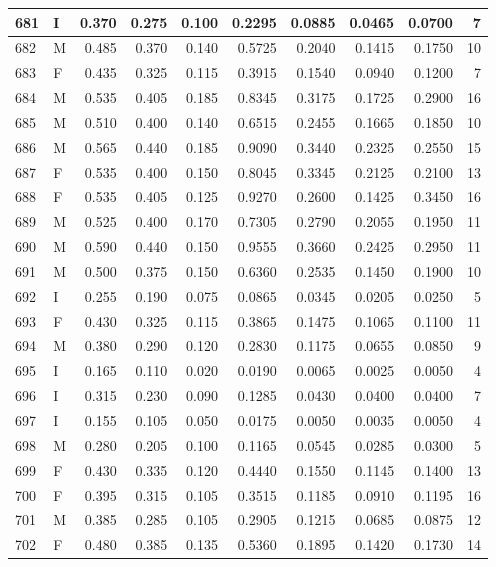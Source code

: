 \documentclass[9pt,twocolumn,twoside,]{pnas-new}
\begin{document}
\begin{tabular}{l|l|r|r|r|r|r|r|r|r}
\hline
681 & I & 0.370 & 0.275 & 0.100 & 0.2295 & 0.0885 & 0.0465 & 0.0700 & 7\\
\hline
682 & M & 0.485 & 0.370 & 0.140 & 0.5725 & 0.2040 & 0.1415 & 0.1750 & 10\\
\hline
683 & F & 0.435 & 0.325 & 0.115 & 0.3915 & 0.1540 & 0.0940 & 0.1200 & 7\\
\hline
684 & M & 0.535 & 0.405 & 0.185 & 0.8345 & 0.3175 & 0.1725 & 0.2900 & 16\\
\hline
685 & M & 0.510 & 0.400 & 0.140 & 0.6515 & 0.2455 & 0.1665 & 0.1850 & 10\\
\hline
686 & M & 0.565 & 0.440 & 0.185 & 0.9090 & 0.3440 & 0.2325 & 0.2550 & 15\\
\hline
687 & F & 0.535 & 0.400 & 0.150 & 0.8045 & 0.3345 & 0.2125 & 0.2100 & 13\\
\hline
688 & F & 0.535 & 0.405 & 0.125 & 0.9270 & 0.2600 & 0.1425 & 0.3450 & 16\\
\hline
689 & M & 0.525 & 0.400 & 0.170 & 0.7305 & 0.2790 & 0.2055 & 0.1950 & 11\\
\hline
690 & M & 0.590 & 0.440 & 0.150 & 0.9555 & 0.3660 & 0.2425 & 0.2950 & 11\\
\hline
691 & M & 0.500 & 0.375 & 0.150 & 0.6360 & 0.2535 & 0.1450 & 0.1900 & 10\\
\hline
692 & I & 0.255 & 0.190 & 0.075 & 0.0865 & 0.0345 & 0.0205 & 0.0250 & 5\\
\hline
693 & F & 0.430 & 0.325 & 0.115 & 0.3865 & 0.1475 & 0.1065 & 0.1100 & 11\\
\hline
694 & M & 0.380 & 0.290 & 0.120 & 0.2830 & 0.1175 & 0.0655 & 0.0850 & 9\\
\hline
695 & I & 0.165 & 0.110 & 0.020 & 0.0190 & 0.0065 & 0.0025 & 0.0050 & 4\\
\hline
696 & I & 0.315 & 0.230 & 0.090 & 0.1285 & 0.0430 & 0.0400 & 0.0400 & 7\\
\hline
697 & I & 0.155 & 0.105 & 0.050 & 0.0175 & 0.0050 & 0.0035 & 0.0050 & 4\\
\hline
698 & M & 0.280 & 0.205 & 0.100 & 0.1165 & 0.0545 & 0.0285 & 0.0300 & 5\\
\hline
699 & F & 0.430 & 0.335 & 0.120 & 0.4440 & 0.1550 & 0.1145 & 0.1400 & 13\\
\hline
700 & F & 0.395 & 0.315 & 0.105 & 0.3515 & 0.1185 & 0.0910 & 0.1195 & 16\\
\hline
701 & M & 0.385 & 0.285 & 0.105 & 0.2905 & 0.1215 & 0.0685 & 0.0875 & 12\\
\hline
702 & F & 0.480 & 0.385 & 0.135 & 0.5360 & 0.1895 & 0.1420 & 0.1730 & 14\\

\end{tabular}
\end{document}
